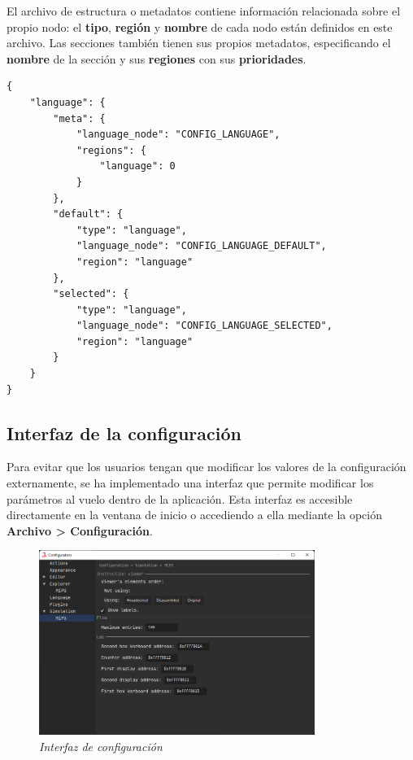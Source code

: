 \noindent El archivo de estructura o metadatos contiene información
relacionada sobre el propio nodo: el \textbf{tipo}, \textbf{región}
y \textbf{nombre} de cada nodo están definidos en este archivo.
Las secciones también tienen sus propios metadatos, especificando
el \textbf{nombre} de la sección y sus \textbf{regiones} con sus
\textbf{prioridades}.

\begin{lstlisting}[frame=single,label={lst:main_config_meta.json}]
{
    "language": {
        "meta": {
            "language_node": "CONFIG_LANGUAGE",
            "regions": {
                "language": 0
            }
        },
        "default": {
            "type": "language",
            "language_node": "CONFIG_LANGUAGE_DEFAULT",
            "region": "language"
        },
        "selected": {
            "type": "language",
            "language_node": "CONFIG_LANGUAGE_SELECTED",
            "region": "language"
        }
    }
}
\end{lstlisting}

\subsection{Interfaz de la configuración}\label{subsec:interfaz-de-la-configuración}

Para evitar que los usuarios tengan que modificar los valores de la configuración
externamente, se ha implementado una interfaz que permite modificar los
parámetros al vuelo dentro de la aplicación.
Esta interfaz es accesible directamente en la ventana de inicio o accediendo a ella
mediante la opción \textbf{Archivo > Configuración}.

\begin{figure}[H]
    \centering
    \includegraphics[width=0.8\textwidth]{images/base/jams-config}
    \caption{\textit{Interfaz de configuración}}
    \label{fig:jams-configuracion}
\end{figure}

